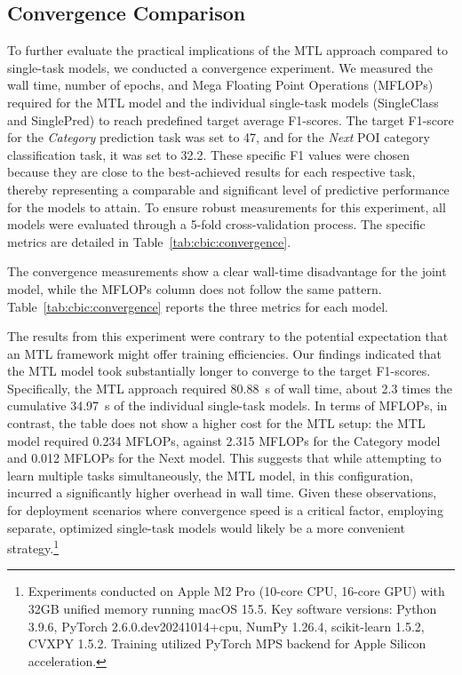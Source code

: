 \subsection{Convergence Comparison}
To further evaluate the practical implications of the MTL approach compared to single-task models, we conducted a convergence experiment. We measured the wall time, number of epochs, and Mega Floating Point Operations (MFLOPs) required for the MTL model and the individual single-task models (SingleClass and SinglePred) to reach predefined target average F1-scores. The target F1-score for the \textit{Category} prediction task was set to 47, and for the \textit{Next} POI category classification task, it was set to 32.2. These specific F1 values were chosen because they are close to the best-achieved results for each respective task, thereby representing a comparable and significant level of predictive performance for the models to attain. To ensure robust measurements for this experiment, all models were evaluated through a 5-fold cross-validation process. The specific metrics are detailed in Table~\ref{tab:cbic:convergence}.

The convergence measurements show a clear wall-time disadvantage for the joint model, while the MFLOPs column does not follow the same pattern. Table~\ref{tab:cbic:convergence} reports the three metrics for each model.



The results from this experiment were contrary to the potential expectation that an MTL framework might offer training efficiencies. Our findings indicated that the MTL model took substantially longer to converge to the target F1-scores. Specifically, the MTL approach required 80.88~s of wall time, about 2.3 times the cumulative 34.97~s of the individual single-task models. In terms of MFLOPs, in contrast, the table does not show a higher cost for the MTL setup: the MTL model required 0.234 MFLOPs, against 2.315 MFLOPs for the Category model and 0.012 MFLOPs for the Next model. This suggests that while attempting to learn multiple tasks simultaneously, the MTL model, in this configuration, incurred a significantly higher overhead in wall time. Given these observations, for deployment scenarios where convergence speed is a critical factor, employing separate, optimized single-task models would likely be a more convenient strategy.\footnote{Experiments conducted on Apple M2 Pro (10-core CPU, 16-core GPU) with 32GB unified memory running macOS 15.5. Key software versions: Python 3.9.6, PyTorch 2.6.0.dev20241014+cpu, NumPy 1.26.4, scikit-learn 1.5.2, CVXPY 1.5.2. Training utilized PyTorch MPS backend for Apple Silicon acceleration.}
